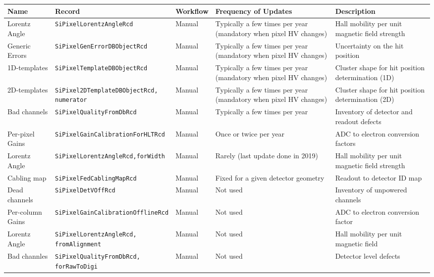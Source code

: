 \begin{table}[h!]
    \centering
    \begin{adjustbox}{max width=\textwidth}
    \begin{tabular}{p{2.5cm}|p{5.7cm}|p{1.5cm}|p{2.5cm}|p{3.0cm}}
        \textbf{Name} & \textbf{Record} & \textbf{Workflow} & \textbf{Frequency of Updates} & \textbf{Description} \\ \hline
      Lorentz Angle   & \texttt{SiPixelLorentzAngleRcd}                 & Manual & Typically a few times per year (mandatory when pixel HV changes) & Hall mobility per unit magnetic field strength\\ \hline
      Generic Errors  & \texttt{SiPixelGenErrorDBObjectRcd}             & Manual & Typically a few times per year (mandatory when pixel HV changes) & Uncertainty on the hit position \\ \hline
      1D-templates     & \texttt{SiPixelTemplateDBObjectRcd}             & Manual & Typically a few times per year (mandatory when pixel HV changes) & Cluster shape for hit position determination (1D)\\ \hline
      2D-templates    & \parbox[t]{5cm}{\texttt{SiPixel2DTemplateDBObjectRcd,}\\\texttt{numerator}} & Manual & Typically a few times per year (mandatory when pixel HV changes) & Cluster shape for hit position determination (2D)\\ \hline
      Bad channels    & \texttt{SiPixelQualityFromDbRcd}                & Manual & Typically a few times per year & Inventory of detector and readout defects \\ \hline
      Per-pixel Gains & \texttt{SiPixelGainCalibrationForHLTRcd}        & Manual & Once or twice per year & ADC to electron conversion factors \\ \hline
      Lorentz Angle   & \texttt{SiPixelLorentzAngleRcd,forWidth}        & Manual & Rarely (last update done in 2019) & Hall mobility per unit magnetic field strength \\ \hline
      Cabling map     & \texttt{SiPixelFedCablingMapRcd}                & Manual & Fixed for a given detector geometry & Readout to detector ID map \\ \hline
      Dead channels   & \texttt{SiPixelDetVOffRcd}                      & Manual & Not used & Inventory of unpowered channels \\ \hline
      Per-column Gains& \texttt{SiPixelGainCalibrationOfflineRcd}       & Manual & Not used & ADC to electron conversion factor \\ \hline
      Lorentz Angle   & \parbox[t]{5cm}{\texttt{SiPixelLorentzAngleRcd,}\\\texttt{fromAlignment}} & Manual & Not used & Hall mobility per unit magnetic field \\ \hline
      Bad channles    & \parbox[t]{5cm}{\texttt{SiPixelQualityFromDbRcd,}\\\texttt{forRawToDigi}} & Manual & Not used & Detector level defects \\ \hline
        

\end{tabular}
\end{adjustbox}
\end{table}
